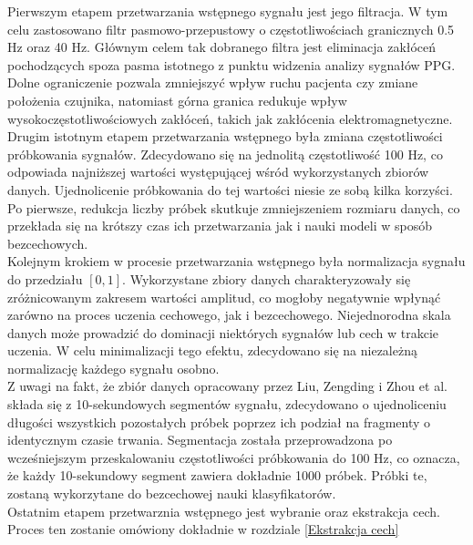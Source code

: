 \documentclass[a4paper,twoside,12pt]{book}
\begin{document}
\newpage
Pierwszym etapem przetwarzania wstępnego sygnału jest jego filtracja. W tym celu zastosowano filtr pasmowo-przepustowy o częstotliwościach granicznych 0.5 Hz oraz 40 Hz. Głównym celem tak dobranego filtra jest eliminacja zakłóceń pochodzących spoza pasma istotnego z punktu widzenia analizy sygnałów PPG. Dolne ograniczenie pozwala zmniejszyć wpływ ruchu pacjenta czy zmiane położenia czujnika, natomiast górna granica redukuje wpływ wysokoczęstotliwościowych zakłóceń, takich jak zakłócenia elektromagnetyczne.\\

Drugim istotnym etapem przetwarzania wstępnego była zmiana częstotliwości próbkowania sygnałów. Zdecydowano się na jednolitą częstotliwość 100 Hz, co odpowiada najniższej wartości występującej wśród wykorzystanych zbiorów danych. Ujednolicenie próbkowania do tej wartości niesie ze sobą kilka korzyści. Po pierwsze, redukcja liczby próbek skutkuje zmniejszeniem rozmiaru danych, co przekłada się na krótszy czas ich przetwarzania jak i nauki modeli w sposób bezcechowych.\\

Kolejnym krokiem w procesie przetwarzania wstępnego była normalizacja sygnału do przedziału $[0, 1]$. Wykorzystane zbiory danych charakteryzowały się zróżnicowanym zakresem wartości amplitud, co mogłoby negatywnie wpłynąć zarówno na proces uczenia cechowego, jak i bezcechowego. Niejednorodna skala danych może prowadzić do dominacji niektórych sygnałów lub cech w trakcie uczenia. W celu minimalizacji tego efektu, zdecydowano się na niezależną normalizację każdego sygnału osobno.\\

Z uwagi na fakt, że zbiór danych opracowany przez Liu, Zengding i Zhou et al.\cite{liu2022multiclass} składa się z 10-sekundowych segmentów sygnału, zdecydowano o ujednoliceniu długości wszystkich pozostałych próbek poprzez ich podział na fragmenty o identycznym czasie trwania. Segmentacja została przeprowadzona po wcześniejszym przeskalowaniu częstotliwości próbkowania do 100 Hz, co oznacza, że każdy 10-sekundowy segment zawiera dokładnie 1000 próbek. Próbki te, zostaną wykorzytane do bezcechowej nauki klasyfikatorów.\\

Ostatnim etapem przetwarznia wstępnego jest wybranie oraz ekstrakcja cech. Proces ten zostanie omówiony dokładnie w rozdziale \ref{Ekstrakcja cech}
\end{document}
